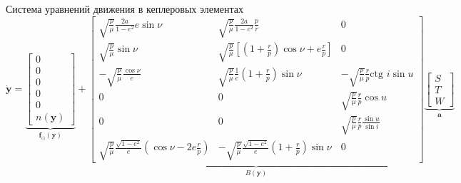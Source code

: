 \documentclass[8pt]{beamer}
\begin{document}
\begin{frame}{Система уравнений движения в кеплеровых элементах}
\begin{equation*}
    \dot{\mathbf{y}} = 
    \underbrace{
    \begin{bmatrix}
        0 \\ 0 \\ 0 \\ 0 \\ 0 \\ n(\mathbf{y})
    \end{bmatrix}
    }_{\mathbf{f}_\odot (\mathbf{y})}
    + 
    \underbrace{
    \begin{bmatrix}
        \sqrt{\frac{p}{\mu}} \frac{2a}{1 - e^2} e \sin \nu &
        \sqrt{\frac{p}{\mu}} \frac{2a}{1 - e^2} \frac{p}{r} & 
        0 \\

        \sqrt{\frac{p}{\mu}} \sin \nu &
        \sqrt{\frac{p}{\mu}} \left[ \left(1 + \frac{r}{p} \right) \cos \nu + e \frac{r}{p} \right] & 
        0 \\

        -\sqrt{\frac{p}{\mu}} \frac{\cos \nu}{e} &
        \sqrt{\frac{p}{\mu}} \frac{1}{e} \left(1 + \frac{r}{p} \right) \sin \nu &
        -\sqrt{\frac{p}{\mu}} \frac{r}{p} \text{ctg } i \sin u \\

        0 &
        0 &
        \sqrt{\frac{p}{\mu}} \frac{r}{p} \cos u \\

        0 & 
        0 &
        \sqrt{\frac{p}{\mu}} \frac{r}{p} \frac{\sin u}{\sin i} \\

        \sqrt{\frac{p}{\mu}} \frac{\sqrt{1 - e^2}}{e} \left( \cos \nu - 2e \frac{r}{p} \right) &
        -\sqrt{\frac{p}{\mu}} \frac{\sqrt{1 - e^2}}{e} \left(1 + \frac{r}{p} \right) \sin \nu &
        0
    \end{bmatrix}
    }_{B(\mathbf{y})}
    \underbrace{
    \begin{bmatrix}
        S \\ T \\ W
    \end{bmatrix}
    }_{\mathbf{a}}
\end{equation*}
\end{frame}
\end{document}
